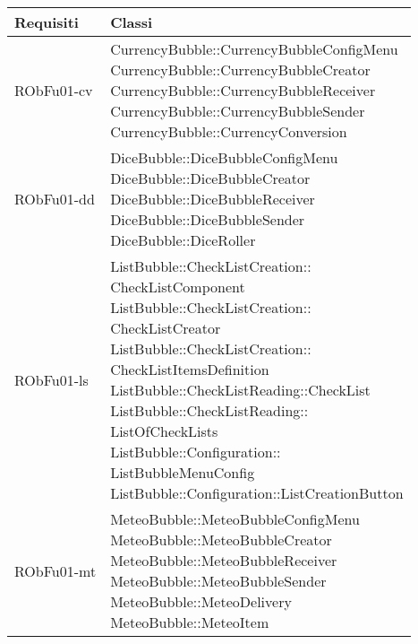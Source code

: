\begin{center}
\begin{longtable}{|
*{1}{>{\centering\arraybackslash}m{2.5cm}|}
*{1}{>{\centering\arraybackslash}m{7.5cm}|}}
\hline \textbf{Requisiti} & \textbf{Classi}\\
\hline \endhead
\hline \endfoot

RObFu01-cv & \makecell[l]{CurrencyBubble::CurrencyBubbleConfigMenu
\\CurrencyBubble::CurrencyBubbleCreator
\\CurrencyBubble::CurrencyBubbleReceiver
\\CurrencyBubble::CurrencyBubbleSender
\\CurrencyBubble::CurrencyConversion
\\}\\\hline
RObFu01-dd & \makecell[l]{DiceBubble::DiceBubbleConfigMenu
\\DiceBubble::DiceBubbleCreator
\\DiceBubble::DiceBubbleReceiver
\\DiceBubble::DiceBubbleSender
\\DiceBubble::DiceRoller
\\}\\\hline
RObFu01-ls & \makecell[l]{ListBubble::CheckListCreation:: \\ \hfill CheckListComponent
\\ListBubble::CheckListCreation:: \\ \hfill CheckListCreator
\\ListBubble::CheckListCreation:: \\ \hfill CheckListItemsDefinition
\\ListBubble::CheckListReading::CheckList
\\ListBubble::CheckListReading:: \\ \hfill ListOfCheckLists
\\ListBubble::Configuration:: \\ \hfill ListBubbleMenuConfig
\\ListBubble::Configuration::ListCreationButton
\\}\\\hline
RObFu01-mt & \makecell[l]{MeteoBubble::MeteoBubbleConfigMenu
\\MeteoBubble::MeteoBubbleCreator
\\MeteoBubble::MeteoBubbleReceiver
\\MeteoBubble::MeteoBubbleSender
\\MeteoBubble::MeteoDelivery
\\MeteoBubble::MeteoItem
}
\end{longtable}
\end{center}
